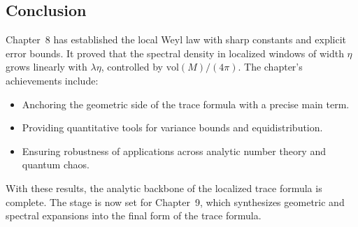 \subsection*{Conclusion}
Chapter~8 has established the local Weyl law with sharp constants and explicit error bounds.  
It proved that the spectral density in localized windows of width $\eta$ grows linearly with $\lambda\eta$, controlled by $\mathrm{vol}(M)/(4\pi)$.  
The chapter’s achievements include:
\begin{itemize}
  \item Anchoring the geometric side of the trace formula with a precise main term.
  \item Providing quantitative tools for variance bounds and equidistribution.
  \item Ensuring robustness of applications across analytic number theory and quantum chaos.
\end{itemize}
With these results, the analytic backbone of the localized trace formula is complete.  
The stage is now set for Chapter~9, which synthesizes geometric and spectral expansions into the final form of the trace formula.
